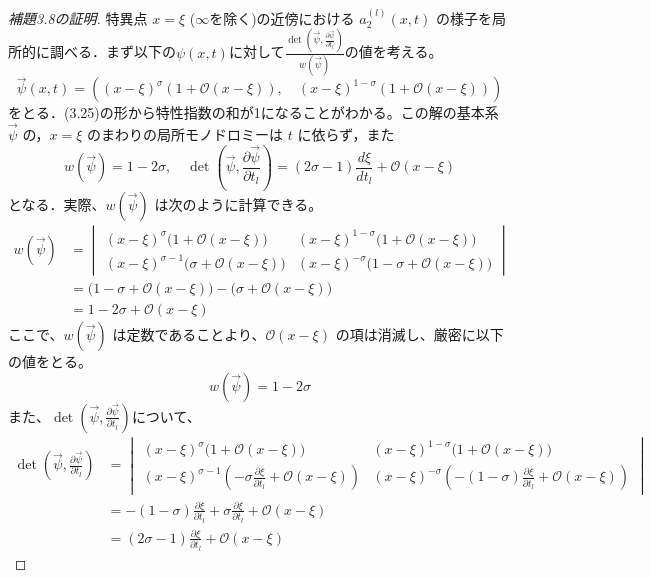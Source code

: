 \begin{story}
\begin{proof}[補題3.8の証明]
特異点 $x=\xi$ ($\infty$を除く)の近傍における $a_2^{(l)}(x,t)$ の様子を局所的に調べる．まず以下の$\psi(x,t)$に対して$\frac{\det \left( \vec{\psi}, \frac{\partial\vec{\psi}}{\partial t_l}\right)}{w(\vec{\psi})}$の値を考える。
\begin{equation*}
    \vec{\psi}(x,t) = \left( (x-\xi)^\sigma(1+\mathcal{O}(x-\xi)), \quad (x-\xi)^{1-\sigma}(1+\mathcal{O}(x-\xi)) \right)
\end{equation*}
をとる．(3.25)の形から特性指数の和が1になることがわかる。この解の基本系 $\vec{\psi}$ の，$x=\xi$ のまわりの局所モノドロミーは $t$ に依らず，また
\begin{equation*}
    w(\vec{\psi}) = 1-2\sigma, \quad \det \left( \vec{\psi}, \frac{\partial \vec{\psi}}{\partial t_l} \right) = (2\sigma - 1)\frac{d\xi}{dt_l} + \mathcal{O}(x-\xi)
\end{equation*}
となる．実際、$w(\vec{\psi})$ は次のように計算できる。
\begin{align*}
    w(\vec{\psi}) &= 
    \begin{vmatrix}
        (x-\xi)^\sigma \big(1 + \mathcal{O}(x-\xi)\big) & (x-\xi)^{1-\sigma} \big(1 + \mathcal{O}(x-\xi)\big) \\[6pt]
        (x-\xi)^{\sigma-1} \big(\sigma + \mathcal{O}(x-\xi)\big) & (x-\xi)^{-\sigma} \big(1-\sigma + \mathcal{O}(x-\xi)\big)
    \end{vmatrix} \\[8pt]
    &= \big(1 - \sigma + \mathcal{O}(x-\xi)\big) - \big(\sigma + \mathcal{O}(x-\xi)\big) \\[4pt]
    &= 1 - 2\sigma + \mathcal{O}(x-\xi)
\end{align*}
ここで、$w(\vec{\psi})$ は定数であることより、$\mathcal{O}(x-\xi)$ の項は消滅し、厳密に以下の値をとる。
\begin{equation}
    w(\vec{\psi}) = 1 - 2\sigma
\end{equation}
また、$\det\left(\vec{\psi}, \frac{\partial \vec{\psi}}{\partial t_l}\right)$について、
\begin{align*}
    \det\left(\vec{\psi}, \frac{\partial \vec{\psi}}{\partial t_l}\right) &= 
    \begin{vmatrix}
        (x-\xi)^\sigma \big(1 + \mathcal{O}(x-\xi)\big) & (x-\xi)^{1-\sigma} \big(1 + \mathcal{O}(x-\xi)\big) \\[6pt]
        (x-\xi)^{\sigma-1} \left(-\sigma \frac{\partial \xi}{\partial t_l} + \mathcal{O}(x-\xi)\right) & (x-\xi)^{-\sigma} \left(-(1-\sigma) \frac{\partial \xi}{\partial t_l} + \mathcal{O}(x-\xi)\right)
    \end{vmatrix} \\[8pt]
    &= -(1-\sigma) \frac{\partial \xi}{\partial t_l} + \sigma \frac{\partial \xi}{\partial t_l} + \mathcal{O}(x-\xi) \\[4pt]
    &= (2\sigma - 1) \frac{\partial \xi}{\partial t_l} + \mathcal{O}(x-\xi)
\end{align*}


\end{proof}
\end{story}
